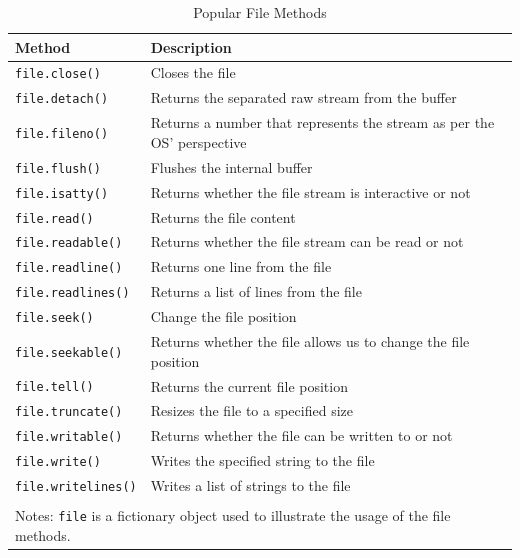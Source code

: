 \documentclass[a4paper,11pt]{book}
\begin{document}
\begin{table}[!htbp]
	\caption{Popular File Methods}
	\label{tab:file-methods}
	\centering
	\begin{tabular}{ll}
		\toprule \toprule
		Method       & Description                                                                          \\
		\midrule
		\texttt{file.close()     } & Closes the file                                                                      \\
		\texttt{file.detach()    } & Returns the separated raw stream from the buffer                                     \\
		\texttt{file.fileno()    } & Returns a number that represents the stream as per the OS' perspective \\
		\texttt{file.flush()     } & Flushes the internal buffer                                                          \\
		\texttt{file.isatty()    } & Returns whether the file stream is interactive or not                                \\
		\texttt{file.read()      } & Returns the file content                                                             \\
		\texttt{file.readable()  } & Returns whether the file stream can be read or not                                   \\
		\texttt{file.readline()  } & Returns one line from the file                                                       \\
		\texttt{file.readlines() } & Returns a list of lines from the file                                                \\
		\texttt{file.seek()      } & Change the file position                                                             \\
		\texttt{file.seekable()  } & Returns whether the file allows us to change the file position                       \\
		\texttt{file.tell()      } & Returns the current file position                                                    \\
		\texttt{file.truncate()  } & Resizes the file to a specified size                                                 \\
		\texttt{file.writable()  } & Returns whether the file can be written to or not                                    \\
		\texttt{file.write()     } & Writes the specified string to the file                                              \\
		\texttt{file.writelines()} & Writes a list of strings to the file                                                 \\
		\bottomrule \\[-1.8ex]
		\multicolumn{2}{l}{Notes: \texttt{file} is a fictionary object used to illustrate the usage of the file methods.} \\
	\end{tabular}
\end{table}
\clearpage
\end{document}
